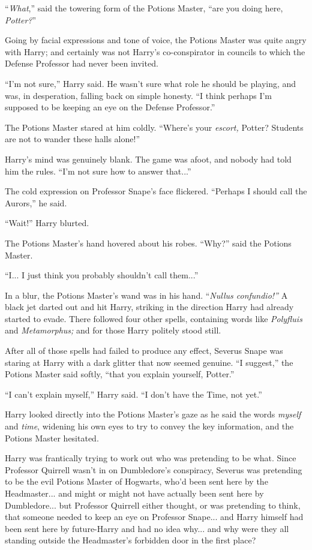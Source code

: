 ``\emph{What},'' said the towering form of the Potions Master, ``are you doing here, \emph{Potter?}''

Going by facial expressions and tone of voice, the Potions Master was quite angry with Harry; and certainly was not Harry's co-conspirator in councils to which the Defense Professor had never been invited.

``I'm not sure,'' Harry said. He wasn't sure what role he should be playing, and was, in desperation, falling back on simple honesty. ``I think perhaps I'm supposed to be keeping an eye on the Defense Professor.''

The Potions Master stared at him coldly. ``Where's your \emph{escort,} Potter? Students are not to wander these halls alone!''

Harry's mind was genuinely blank. The game was afoot, and nobody had told him the rules. ``I'm not sure how to answer that...''

The cold expression on Professor Snape's face flickered. ``Perhaps I should call the Aurors,'' he said.

``Wait!'' Harry blurted.

The Potions Master's hand hovered about his robes. ``Why?'' said the Potions Master.

``I... I just think you probably shouldn't call them...''

In a blur, the Potions Master's wand was in his hand. ``\emph{Nullus confundio!''} A black jet darted out and hit Harry, striking in the direction Harry had already started to evade. There followed four other spells, containing words like \emph{Polyfluis} and \emph{Metamorphus;} and for those Harry politely stood still.

After all of those spells had failed to produce any effect, Severus Snape was staring at Harry with a dark glitter that now seemed genuine. ``I suggest,'' the Potions Master said softly, ``that you explain yourself, Potter.''

``I can't explain myself,'' Harry said. ``I don't have the Time, not yet.''

Harry looked directly into the Potions Master's gaze as he said the words \emph{myself} and \emph{time}, widening his own eyes to try to convey the key information, and the Potions Master hesitated.

Harry was frantically trying to work out who was pretending to be what. Since Professor Quirrell wasn't in on Dumbledore's conspiracy, Severus was pretending to be the evil Potions Master of Hogwarts, who'd been sent here by the Headmaster... and might or might not have actually been sent here by Dumbledore... but Professor Quirrell either thought, or was pretending to think, that someone needed to keep an eye on Professor Snape... and Harry himself had been sent here by future-Harry and had no idea why... and why were they all standing outside the Headmaster's forbidden door in the first place?


